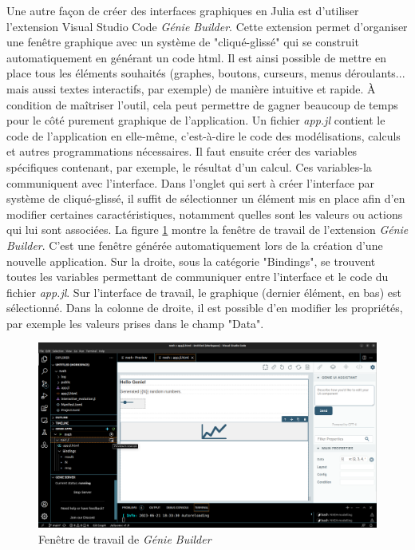 \documentclass[a4paper, french, 12pt, titlepage]{article}
\begin{document}
Une autre façon de créer des interfaces graphiques en Julia est d'utiliser l'extension Visual Studio Code \emph{Génie Builder}.
Cette extension permet d'organiser une fenêtre graphique avec un système de "cliqué-glissé" qui se construit automatiquement en générant un code html.
Il est ainsi possible de mettre en place tous les éléments souhaités (graphes, boutons, curseurs, menus déroulants... mais aussi textes interactifs, par exemple) de manière intuitive et rapide.
À condition de maîtriser l'outil, cela peut permettre de gagner beaucoup de temps pour le côté purement graphique de l'application.
Un fichier \emph{app.jl} contient le code de l'application en elle-même, c'est-à-dire le code des modélisations, calculs et autres programmations nécessaires.
Il faut ensuite créer des variables spécifiques contenant, par exemple, le résultat d'un calcul.
Ces variables-la communiquent avec l'interface.
Dans l'onglet qui sert à créer l'interface par système de cliqué-glissé, il suffit de sélectionner un élément mis en place afin d'en modifier certaines caractéristiques, notamment quelles sont les valeurs ou actions qui lui sont associées. 
La figure \ref{fig:fig6} montre la fenêtre de travail de l'extension \emph{Génie Builder}.
C'est une fenêtre générée automatiquement lors de la création d'une nouvelle application.
Sur la droite, sous la catégorie "Bindings", se trouvent toutes les variables permettant de communiquer entre l'interface et le code du fichier \emph{app.jl}.
Sur l'interface de travail, le graphique (dernier élément, en bas) est sélectionné.
Dans la colonne de droite, il est possible d'en modifier les propriétés, par exemple les valeurs prises dans le champ "Data". 

\begin{figure}[H]
  \includegraphics[width=\linewidth]{geniebuilder_travail.png}
  \caption{Fenêtre de travail de \emph{Génie Builder}}
  \label{fig:fig6}
\end{figure}
\end{document}
